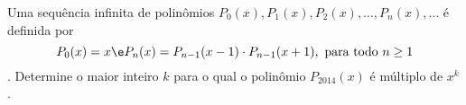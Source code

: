 Uma sequência infinita de polinômios $P_0(x), P_1(x), P_2(x), \dots, P_n(x), \dots$ é definida por
$$P_0(x) = x \e P_n(x) = P_{n-1}(x - 1) \cdot P_{n-1}(x + 1),\text{\ para todo\ }n \ge 1$$.
Determine o maior inteiro $k$ para o qual o polinômio $P_{2014}(x)$ é múltiplo de $x^k$.